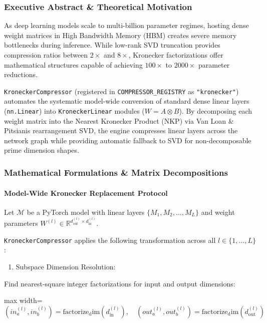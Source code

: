 \subsubsection*{Executive Abstract \& Theoretical Motivation}
As deep learning models scale to multi-billion parameter regimes, hosting dense weight matrices in High Bandwidth Memory (HBM) creates severe memory bottlenecks during inference. While low-rank SVD truncation provides compression ratios between $2\times$ and $8\times$, Kronecker factorizations offer mathematical structures capable of achieving $100\times$ to $2000\times$ parameter reductions.

\texttt{KroneckerCompressor} (registered in \texttt{COMPRESSOR\_REGISTRY} as \texttt{"kronecker"}) automates the systematic model-wide conversion of standard dense linear layers (\texttt{nn.Linear}) into \texttt{KroneckerLinear} modules ($W = A \otimes B$). By decomposing each weight matrix into the Nearest Kronecker Product (NKP) via Van Loan \& Pitsianis rearrangement SVD, the engine compresses linear layers across the network graph while providing automatic fallback to SVD for non-decomposable prime dimension shapes.


\subsubsection*{Mathematical Formulations \& Matrix Decompositions}

\paragraph{Model-Wide Kronecker Replacement Protocol}
Let $\mathcal{M}$ be a PyTorch model with linear layers $\{M_1, M_2, \dots, M_L\}$ and weight parameters $W^{(l)} \in \mathbb{R}^{d_{\text{out}}^{(l)} \times d_{\text{in}}^{(l)}}$.

\texttt{KroneckerCompressor} applies the following transformation across all $l \in \{1, \dots, L\}$:

\begin{enumerate}
\item Subspace Dimension Resolution:
\end{enumerate}
Find nearest-square integer factorizations for input and output dimensions:

\begin{center}
\begin{adjustbox}{max width=\columnwidth}
$\displaystyle
(in_a^{(l)}, in_b^{(l)}) = \operatorname{factorize_dim}(d_{\text{in}}^{(l)}), \quad (out_a^{(l)}, out_b^{(l)}) = \operatorname{factorize_dim}(d_{\text{out}}^{(l)})
$
\end{adjustbox}
\end{center}

